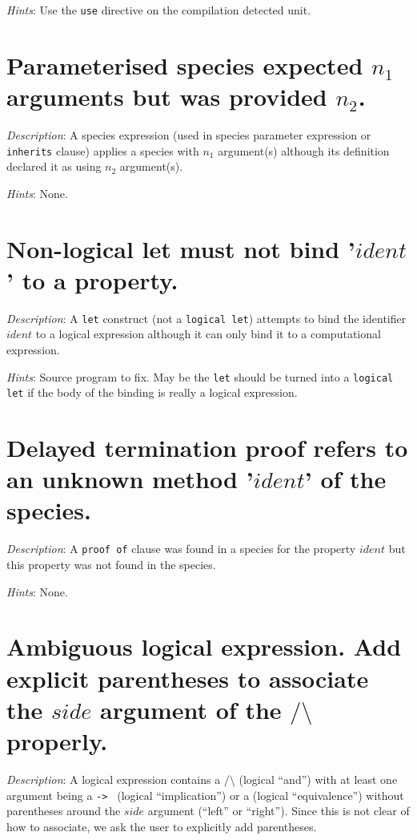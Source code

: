 {\em Hints}: Use the {\tt use} directive on the compilation detected
unit.



\section*{Parameterised species  expected $n_1$ arguments but
  was provided $n_2$.}
{\em Description}: A species expression (used in species parameter
expression or {\tt inherits} clause) applies a species with $n_1$
argument(s) although its definition declared it as using $n_2$
argument(s).

{\em Hints}: None.



\section*{Non-logical let must not bind '$ident$' to a property.}
{\em Description}: A {\tt let} construct (not a {\tt logical let})
attempts to bind the identifier $ident$ to a logical expression
although it can only bind it to a computational expression.

{\em Hints}: Source program to fix. May be the {\tt let} should be
turned into a {\tt logical let} if the body of the binding is really a
logical expression.



\section*{Delayed termination proof refers to an unknown method
  '$ident$' of the species.}
{\em Description}: A {\tt proof of} clause was found in a species for
the property $ident$ but this property was not found in the species.

{\em Hints}: None.



\section*{Ambiguous logical expression. Add explicit parentheses to
  associate the $side$ argument of the $/\setminus$ properly.}
{\em Description}: A logical expression contains a
{\tt $/\setminus$} (logical ``and'') with at least one argument being a
{\tt -> } (logical ``implication'') or a {\tt <->} (logical
``equivalence'') without parentheses around the $side$ argument (``left''
or ``right''). Since this is not clear of how to associate, we  ask the user to explicitly add parentheses.

